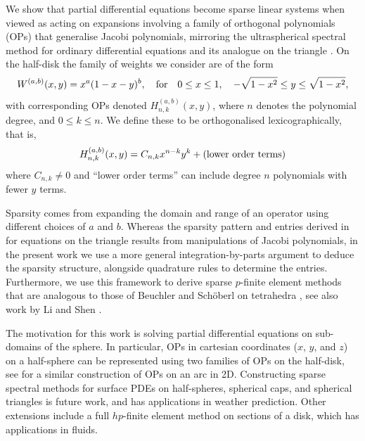 \documentclass[11pt, oneside]{article}   	%
\newcommand{\hdop}{H}
\newcommand{\hdopnkab}{\hdop_{n,k}^{(a,b)}}
\begin{document}
We show that partial differential equations become sparse linear systems when viewed as acting on expansions involving a family of orthogonal polynomials (OPs) that  generalise Jacobi polynomials, mirroring the ultraspherical spectral method for ordinary differential equations \cite{olver2013fast} and its analogue on the triangle \cite{olver2018recurrence,olver2019triangle}.  On the half-disk the family of weights we consider are of the form
$$
W^{(a,b)}(x,y) = x^a (1-x-y)^b, \quad\hbox{for}\quad 0 \leq x \leq 1,\quad -\sqrt{1-x^2} \leq y \leq \sqrt{1-x^2},
$$
with corresponding OPs denoted $\hdopnkab(x,y)$, where $n$ denotes the polynomial degree, and $0 \le k \le n$. We define these to be orthogonalised lexicographically, that is,
$$
\hdopnkab(x,y) = C_{n,k} x^{n-k} y^k + (\hbox{lower order terms})
$$
where $C_{n,k} \neq 0$ and ``lower order terms'' can  include degree $n$ polynomials with fewer $y$ terms.

Sparsity comes from expanding the domain and range of an operator  using different choices of $a$ and $b$. Whereas the sparsity pattern and entries derived in \cite{olver2018recurrence,olver2019triangle} for equations on the triangle  results from manipulations of Jacobi polynomials, in the present work we use a more general integration-by-parts argument to deduce the sparsity structure, alongside quadrature rules to determine the entries.  Furthermore, we use this framework to derive sparse $p$-finite element methods that are analogous to those of Beuchler and Sch\"oberl on tetrahedra \cite{beuchler2006new}, see also work by Li and Shen \cite{li2010optimal}. 

The motivation for this work is solving partial differential equations on sub-domains of the sphere. In particular, OPs in cartesian coordinates ($x$, $y$, and $z$) on a half-sphere  can be represented using two families of OPs on the half-disk, see \cite[Theorem 3.1]{olver2018orthogonal} for a similar construction of OPs on an arc in 2D.
Constructing sparse spectral methods for surface PDEs on half-spheres, spherical caps, and spherical triangles is future work, and has applications in weather prediction. Other extensions include a full $hp$-finite element method on sections of a disk, which has applications in fluids. 
\end{document}
